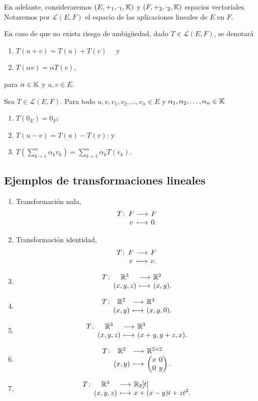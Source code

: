 \documentclass[a4,11pt]{aleph-notas}
\begin{document}
En adelante, consideraremos $(E,+_1,\cdot_1,\mathbb{K})$ y $(F,+_2,\cdot_2,\mathbb{K})$ espacios vectoriales. Notaremos por $\mathcal{L}(E,F)$ el espacio de las aplicaciones lineales de $E$ en $F$.

\begin{advertencia}
    En caso de que no exista riesgo de ambigüedad, dado $T \in \mathcal{L}(E,F)$, se denotará
    \begin{enumerate}
    \item 
        $T(u + v) = T(u) + T(v)\quad$ y
    \item 
        $T(\alpha v ) = \alpha T(v)$,
    \end{enumerate}
    para $\alpha \in \mathbb{K}$ y $u,v \in E$.
\end{advertencia}
    
\begin{teo}
     Sea $T \in \mathcal{L}(E,F)$. Para todo $u,v, v_1, v_2, \ldots, v_n \in E$ y $\alpha_1, \alpha_2, \ldots, \alpha_n \in \mathbb{K}$
     \begin{enumerate}
         \item $T(0_E) = 0_F$;
         \item $T(u-v) = T(u) - T(v)$: y
         \item $T\left(\displaystyle \sum_{k=1}^n \alpha_k v_k \right)= 
         \displaystyle \sum_{k=1}^n \alpha_k T\left(v_k \right)$.
     \end{enumerate}
\end{teo}

\subsection{Ejemplos de transformaciones lineales}
\begin{enumerate}
\item 
    Transformación nula, \[\funcion{T}{F}{F}{v}{0.}\]
\item 
    Transformación identidad, \[\funcion{T}{F}{F}{v}{v.}\]
\item 
    \[
        \funcion{T}{\R^3}{\R^2}
            {(x,y,z)}{(x, y).}
    \]
\item 
    \[
        \funcion{T}{\R^2}{\R^3}
            {(x,y)}{(x, y,0).}
    \]
\item 
    \[
        \funcion{T}{\R^3}{\R^3}
            {(x,y,z)}{(x+y, y + z,x).}
    \]
\item 
    \[
        \funcion{T}{\R^2}{\Mat{2}{2}}
            {(x,y)}{\begin{pmatrix}x& 0\\ 0 &y\end{pmatrix}.}
    \]
\item 
    \[
        \funcion{T}{\R^3}{\R_2[t]}
            {(x,y,z)}{x+(x-y)t + zt^2.}
    \]
\end{enumerate}
\end{document}
